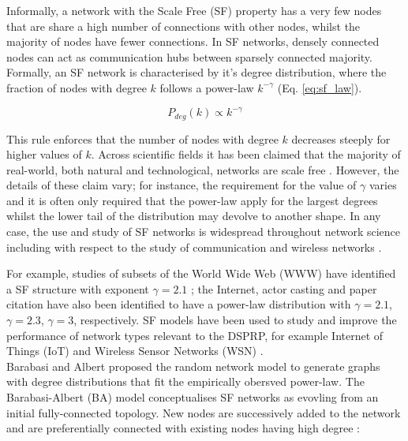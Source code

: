 \documentclass[
	a4paper, %
	10pt, %
	unnumberedsections, %
	twoside, %
]{LTJournalArticle}
\begin{document}
Informally, a network with the Scale Free (SF) property has a very few nodes that are share a high number of connections with other nodes, whilst the majority of nodes have fewer connections. In SF networks, densely connected nodes can act as communication hubs between sparsely connected majority. Formally, an SF network is characterised by it's degree distribution, where the fraction of nodes with degree \(k\) follows a power-law \(k^{-\gamma}\) (Eq. \ref{eq:sf_law}). 

\begin{equation}
	P_{deg}(k) \propto k^{-\gamma}
	\label{eq:sf_law}
\end{equation}

This rule enforces that the number of nodes with degree \(k\) decreases steeply for higher values of \(k\). Across scientific fields it has been claimed that the majority of real-world, both natural and technological, networks are scale free \cite{broido:19}. However, the details of these claim vary; for instance, the requirement for the value of \(\gamma\) varies and it is often only required that the power-law apply for the largest degrees whilst the lower tail of the distribution may devolve to another shape. In any case, the use and study of SF networks is widespread throughout network science including with respect to the study of communication and wireless networks \cite{broido:19}. 

For example, studies of subsets of the World Wide Web (WWW) have identified a SF structure with exponent \(\gamma = 2.1\) \cite{albert:02}; the Internet, actor casting and paper citation have also been identified to have a power-law distribution with \(\gamma = 2.1\), \(\gamma = 2.3\), \(\gamma = 3\), respectively. SF models have been used to study and improve the performance of network types relevant to the DSPRP, for example Internet of Things (IoT) and Wireless Sensor Networks (WSN) \cite{sohn:17}.\\

Barabasi and Albert proposed the random network model to generate graphs with degree distributions that fit the empirically obersved power-law. The Barabasi-Albert (BA) model conceptualises SF networks as evovling from an initial fully-connected topology. New nodes are successively added to the network and are preferentially connected with existing nodes having high degree \cite{albert:99}:
\end{document}
